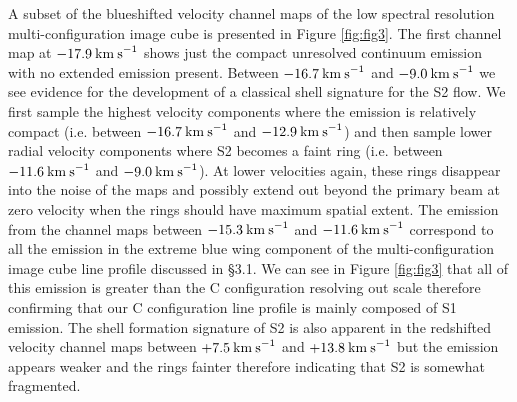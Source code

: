 \documentclass[iop]{emulateapj}
\begin{document}
A subset of the blueshifted velocity channel maps of the low spectral resolution multi-configuration image cube is presented in Figure \ref{fig:fig3}. The first channel map at $-17.9\>{\rm km\>s}^{-1}$ shows just the compact unresolved continuum emission with no extended emission present. Between $-16.7\>{\rm km\>s}^{-1}$ and $-9.0\>{\rm km\>s}^{-1}$ we see evidence for the development of a classical shell signature for the S2 flow. We first sample the highest velocity components where the emission is relatively compact (i.e. between $-16.7\>{\rm km\>s}^{-1}$ and $-12.9\>{\rm km\>s}^{-1}$) and then sample lower radial velocity components where S2 becomes a faint ring (i.e. between $-11.6\>{\rm km\>s}^{-1}$ and $-9.0\>{\rm km\>s}^{-1}$). At lower velocities again, these rings disappear into the noise of the maps and possibly extend out beyond the primary beam at zero velocity when the rings should have maximum spatial extent. The emission from the channel maps between $-15.3\>{\rm km\>s}^{-1}$ and $-11.6\>{\rm km\>s}^{-1}$ correspond to all the emission in the extreme blue wing component of the multi-configuration image cube line profile discussed in \S3.1. We can see in Figure \ref{fig:fig3} that all of this emission is greater than the C configuration resolving out scale therefore confirming that our C configuration line profile is mainly composed of S1 emission. The shell formation signature of S2 is also apparent in the redshifted velocity channel maps between $+7.5\>{\rm km\>s}^{-1}$ and $+13.8\>{\rm km\>s}^{-1}$ but the emission appears weaker and the rings fainter therefore indicating that S2 is somewhat fragmented. 
\end{document}
